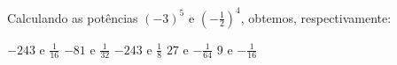Calculando as potências $(-3)^5$ e $\left(-\frac{1}{2}\right)^4$, obtemos, respectivamente:

$-243$ e $\frac{1}{16}$
$-81$ e $\frac{1}{32}$
$-243$ e $\frac{1}{8}$
$27$ e $-\frac{1}{64}$
$9$ e $-\frac{1}{16}$


